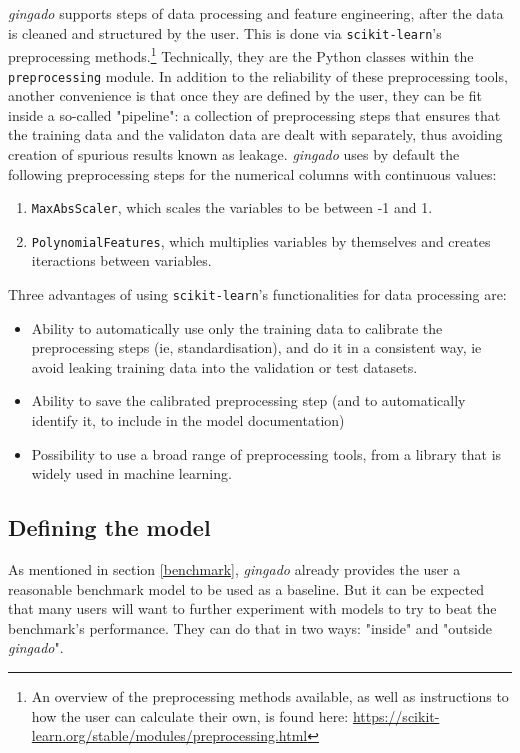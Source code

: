 \documentclass{article}
\begin{document}
\textit{gingado} supports steps of data processing and feature engineering, after the data is cleaned and structured by the user. This is done via \texttt{scikit-learn}'s preprocessing methods.\footnote{An overview of the preprocessing methods available, as well as instructions to how the user can calculate their own, is found here: \url{https://scikit-learn.org/stable/modules/preprocessing.html}} Technically, they are the Python classes within the \texttt{preprocessing} module. In addition to the reliability of these preprocessing tools, another convenience is that once they are defined by the user, they can be fit inside a so-called "pipeline": a collection of preprocessing steps that ensures that the training data and the validaton data are dealt with separately, thus avoiding creation of spurious results known as leakage. \textit{gingado} uses by default the following preprocessing steps for the numerical columns with continuous values:


 \begin{enumerate}
        \item \texttt{MaxAbsScaler}, which scales the variables to be between -1 and 1. 
        \item \texttt{PolynomialFeatures}, which multiplies variables by themselves and creates iteractions between variables.
    \end{enumerate}

Three advantages of using \texttt{scikit-learn}'s functionalities for data processing are:
\begin{itemize}
    \item Ability to automatically use only the training data to calibrate the preprocessing steps (ie, standardisation), and do it in a consistent way, ie avoid leaking training data into the validation or test datasets.
    \item Ability to save the calibrated preprocessing step (and to automatically identify it, to include in the model documentation)
    \item Possibility to use a broad range of preprocessing tools, from a library that is widely used in machine learning.
\end{itemize}




\subsection{Defining the model}

As mentioned in section \ref{benchmark}, \textit{gingado} already provides the user a reasonable benchmark model to be used as a baseline. But it can be expected that many users will want to further experiment with models to try to beat the benchmark's performance. They can do that in two ways: "inside" and "outside \textit{gingado}".
\end{document}
